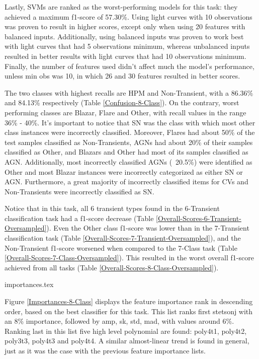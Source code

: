 \documentclass[a4paper,fleqn,usenatbib]{mnras}
\begin{document}
Lastly, SVMs are ranked as the worst-performing models for this task: they achieved a maximum f1-score of 57.30\%. Using light curves with 10 observations was proven to result in higher scores, except only when using 20 features with balanced inputs. Additionally, using balanced inputs was proven to work best with light curves that had 5 observations minimum, whereas unbalanced inputs resulted in better results with light curves that had 10 observations minimum. Finally, the number of features used didn't affect much the model's performance, unless min \textunderscore obs was 10, in which 26 and 30 features resulted in better scores.

The two classes with highest recalls are HPM and Non-Transient, with a 86.36\% and 84.13\% respectively (Table \ref{Confusion-8-Class}). On the contrary, worst performing classes are Blazar, Flare and Other, with recall values in the range 36\% - 40\%. It's important to notice that SN was the class with which most other class instances were incorrectly classified. Moreover, Flares had about 50\% of the test samples classified as Non-Transients, AGNs had about 20\% of their samples classified as Other, and Blazars and Other had most of  its samples classified as AGN. Additionally, most incorrectly classified AGNs (~20.5\%) were identified as Other and most Blazar instances were incorrectly categorized as either SN or AGN. Furthermore, a great majority of incorrectly classified items for CVs and Non-Transients were incorrectly classified as SN.

Notice that in this task, all 6 transient types found in the 6-Transient classification task had a f1-score decrease (Table \ref{Overall-Scores-6-Transient-Oversampled}). Even the Other class f1-score was lower than in the 7-Transient classification task (Table \ref{Overall-Scores-7-Transient-Oversampled}), and the Non-Transient f1-score worsened when compared to the 7-Class task (Table \ref{Overall-Scores-7-Class-Oversampled}). This resulted in the worst overall f1-score achieved from all tasks (Table \ref{Overall-Scores-8-Class-Oversampled}).

{importances.tex}

Figure \ref{Importances-8-Class} displays the feature importance rank in descending order, based on the best classifier for this task. 
This list ranks first stetson\textunderscore j with an 8\% importance, followed by amp, sk, std, mad, with values around 6\%. Ranking last in this list five high level polynomial are found: poly4\textunderscore t1,  poly4\textunderscore t2, poly3\textunderscore t3, poly4\textunderscore t3 and poly4\textunderscore t4. A similar almost-linear trend is found in general, just as it was the case with the previous feature importance lists.
\end{document}
